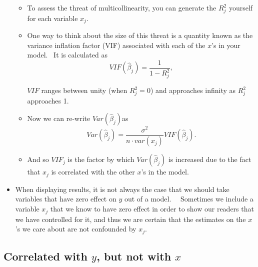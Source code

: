 \documentclass[11pt]{article}
\begin{document}
\begin{itemize}
\begin{itemize}
\item To assess the threat of multicollinearity, you can generate the $%
R_{j}^{2}$ yourself for each variable $x_{j}$.

\item One way to think about the size of this threat is a quantity known as
the variance inflation factor (VIF) associated with each of the $x$'s in
your model. \ It is calculated as 
\begin{equation*}
VIF\left( \widehat{\beta }_{j}\right) =\frac{1}{1-R_{j}^{2}},
\end{equation*}

$VIF$ ranges between unity (when $R_{j}^{2}=0$) and approaches infinity as $%
R_{j}^{2}$ approaches 1. \ 

\item Now we can re-write $Var\left( \widehat{\beta }_{j}\right) $as 
\begin{equation*}
Var\left( \widehat{\beta }_{j}\right) =\frac{\sigma ^{2}}{n\cdot var(x_{j})}%
VIF\left( \widehat{\beta }_{j}\right) .
\end{equation*}

\item And so $VIF_{j}$ is the factor by which $Var\left( \widehat{\beta }%
_{j}\right) $ is increased due to the fact that $x_{j}$ is correlated with
the other $x$'s in the model. 
\end{itemize}

\item When displaying results, it is not always the case that we should take
variables that have zero effect on $y$ out of a model. \ \ Sometimes we
include a variable $x_{j}$ that we know to have zero effect in order to show
our readers that we have controlled for it, and thus we are certain that the
estimates on the $x$'s we care about are not confounded by $x_{j}$.
\end{itemize}

\subsection{Correlated with $y$, but not with $x$}
\end{document}
